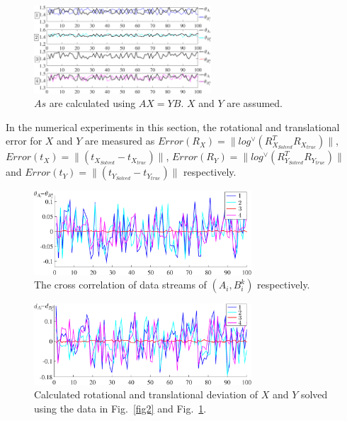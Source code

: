 \documentclass[letterpaper, 10 pt, conference]{ieeeconf}  %
\begin{document}
\begin{figure}
\centering
\includegraphics[width=2.6in,bb=84 202 501 581]{fig2.eps}
\caption{
$As$ are calculated using $AX=YB$. $X$ and $Y$ are assumed.
}
\label{fig3}
\end{figure}


In the numerical experiments in this section, the rotational and translational error for $X$ and $Y$ are measured as  $Error(R_X) = \parallel log^{\vee} (R_{X_{Solved}}^{T}R_{X_{true}})\parallel$, $Error(t_X) = \parallel (t_{X_{Solved}}-t_{X_{true}})\parallel$, $Error(R_Y) = \parallel log^{\vee} (R_{Y_{Solved}}^{T}R_{Y_{true}})\parallel$ and $Error(t_Y) = \parallel (t_{Y_{Solved}}-t_{Y_{true}})\parallel$ respectively.

\begin{center}
\begin{figure}
\centering
\includegraphics[width=3.2in]{fig4.eps}
\caption{
The cross correlation of data streams of $(A_{i},B_{i}^{k})$ respectively.
}
\label{fig4}
\end{figure}
\end{center}

\begin{center}
\begin{figure}
\centering
\includegraphics[width=3.2in]{fig5.eps}
\caption{
Calculated rotational and translational deviation of $X$ and $Y$ solved using the data in Fig.~\ref{fig2} and Fig.~\ref{fig3}.
}
\label{fig5}
\end{figure}
\end{center}
\end{document}
